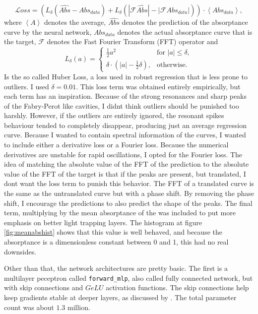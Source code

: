 \begin{equation}
\mathcal{L}oss = \left(L_\delta(\hat{Abs} - Abs_{data}) + L_\delta(|\mathcal{F}{\hat{Abs}}| - |\mathcal{F}{Abs_{data}}|)\right)\cdot \left<Abs_{data}\right>,
\end{equation}
where $\left<A\right>$ denotes the average, $\hat{Abs}$ denotes the prediction of the absorptance curve by the neural network, $Abs_{data}$ denotes the actual absorptance curve that is the target, $\mathcal{F}$ denotes the Fast Fourier Transform (FFT) operator and
$$
L_\delta(a) = \begin{cases} 
\frac{1}{2}a^2 & \text{for } |a| \le \delta, \\ 
\delta \cdot (|a| - \frac{1}{2}\delta), & \text{otherwise.} 
\end{cases}
$$
Is the so called Huber Loss, a loss used in robust regression that is less prone to outliers. I used $\delta=0.01$. This loss term was obtained entirely empirically, but each term has an inspiration.
Because of the strong resonances and sharp peaks of the Fabry-Perot like cavities, I didnt think outliers should be punished too harshly. However, if the outliers are entirely ignored, the resonant spikes behaviour tended to completely disappear, producing just an average regression curve.
Because I wanted to contain spectral information of the curves, I wanted to include either a derivative loss or a Fourier loss. Because the numerical derivatives are unstable for rapid oscillations, I opted for the Fourier loss.
The idea of matching the absolute value of the FFT of the prediction to the absolute value of the FFT of the target is that if the peaks are present, but translated, I dont want the loss term to punish this behavior.
The FFT of a translated curve is the same as the untranslated curve but with a phase shift. By removing the phase shift, I encourage the predictions to also predict the shape of the peaks. The final term, multiplying by the mean absorptance of the was included to put more emphasis on better light trapping layers.
The histogram at figure \ref{fig:meanabshist} shows that this value is well behaved, and because the absorptance is a dimensionless constant between 0 and 1, this had no real downsides.

Other than that, the network architectures are pretty basic. The first is a multilayer peceptron called \texttt{forward\_mlp}, also called fully connected network, but with skip connections and $GeLU$ activation functions. The skip connections
help keep gradients stable at deeper layers, as discussed by \cite{he2016deep}. The total parameter count was about $1.3$ million.

